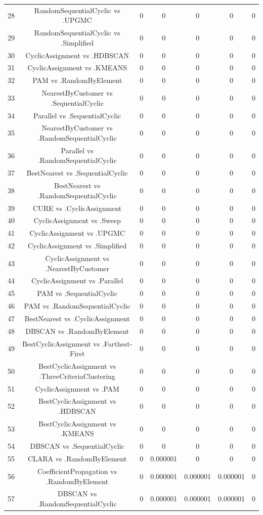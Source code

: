 \documentclass[a4paper,10pt]{article}
\begin{document}
\begin{landscape}
\begin{table}[!htp]
\begin{tabular}{ccccccc}
28&RandomSequentialCyclic vs .UPGMC&0&0&0&0&0\\
29&RandomSequentialCyclic vs .Simplified&0&0&0&0&0\\
30&CyclicAssignment vs .HDBSCAN&0&0&0&0&0\\
31&CyclicAssignment vs .KMEANS&0&0&0&0&0\\
32&PAM vs .RandomByElement&0&0&0&0&0\\
33&NearestByCustomer vs .SequentialCyclic&0&0&0&0&0\\
34&Parallel vs .SequentialCyclic&0&0&0&0&0\\
35&NearestByCustomer vs .RandomSequentialCyclic&0&0&0&0&0\\
36&Parallel vs .RandomSequentialCyclic&0&0&0&0&0\\
37&BestNearest vs .SequentialCyclic&0&0&0&0&0\\
38&BestNearest vs .RandomSequentialCyclic&0&0&0&0&0\\
39&CURE vs .CyclicAssignment&0&0&0&0&0\\
40&CyclicAssignment vs .Sweep&0&0&0&0&0\\
41&CyclicAssignment vs .UPGMC&0&0&0&0&0\\
42&CyclicAssignment vs .Simplified&0&0&0&0&0\\
43&CyclicAssignment vs .NearestByCustomer&0&0&0&0&0\\
44&CyclicAssignment vs .Parallel&0&0&0&0&0\\
45&PAM vs .SequentialCyclic&0&0&0&0&0\\
46&PAM vs .RandomSequentialCyclic&0&0&0&0&0\\
47&BestNearest vs .CyclicAssignment&0&0&0&0&0\\
48&DBSCAN vs .RandomByElement&0&0&0&0&0\\
49&BestCyclicAssignment vs .Farthest-First&0&0&0&0&0\\
50&BestCyclicAssignment vs .ThreeCriteriaClustering&0&0&0&0&0\\
51&CyclicAssignment vs .PAM&0&0&0&0&0\\
52&BestCyclicAssignment vs .HDBSCAN&0&0&0&0&0\\
53&BestCyclicAssignment vs .KMEANS&0&0&0&0&0\\
54&DBSCAN vs .SequentialCyclic&0&0&0&0&0\\
55&CLARA vs .RandomByElement&0&0.000001&0&0&0\\
56&CoefficientPropagation vs .RandomByElement&0&0.000001&0.000001&0.000001&0\\
57&DBSCAN vs .RandomSequentialCyclic&0&0.000001&0.000001&0.000001&0\\

\end{tabular}
\end{table}
\end{landscape}
\end{document}
